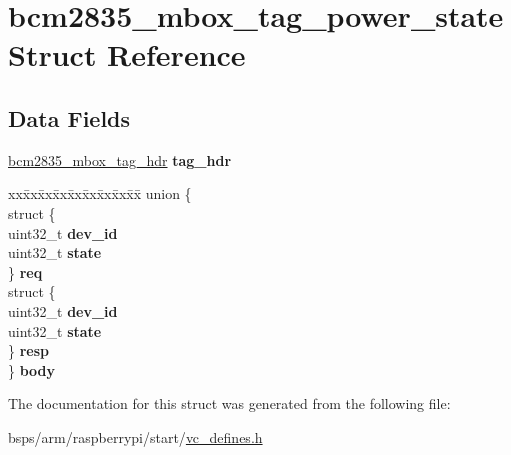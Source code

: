\hypertarget{structbcm2835__mbox__tag__power__state}{}\section{bcm2835\+\_\+mbox\+\_\+tag\+\_\+power\+\_\+state Struct Reference}
\label{structbcm2835__mbox__tag__power__state}
\subsection*{Data Fields}
\begin{DoxyCompactItemize}
\item 
\mbox{\label{structbcm2835__mbox__tag__power__state_a545f7144ddb581cdd655531c334cd919}} 
\mbox{\hyperlink{structbcm2835__mbox__tag__hdr}{bcm2835\+\_\+mbox\+\_\+tag\+\_\+hdr}} {\bfseries tag\+\_\+hdr}
\item 
\mbox{\label{structbcm2835__mbox__tag__power__state_acf651f531d877930e2a6691fe3087364}} 
\begin{tabbing}
xx\=xx\=xx\=xx\=xx\=xx\=xx\=xx\=xx\=\kill
union \{\\
\>struct \{\\
\>\>uint32\_t {\bfseries dev\_id}\\
\>\>uint32\_t {\bfseries state}\\
\>\} {\bfseries req}\\
\>struct \{\\
\>\>uint32\_t {\bfseries dev\_id}\\
\>\>uint32\_t {\bfseries state}\\
\>\} {\bfseries resp}\\
\} {\bfseries body}\\

\end{tabbing}\end{DoxyCompactItemize}


The documentation for this struct was generated from the following file\+:\begin{DoxyCompactItemize}
\item 
bsps/arm/raspberrypi/start/\mbox{\hyperlink{vc__defines_8h}{vc\+\_\+defines.\+h}}\end{DoxyCompactItemize}
